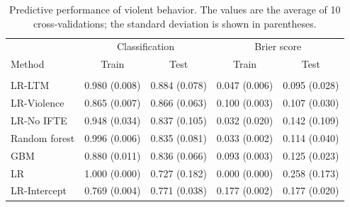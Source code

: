 \documentclass[a4paper,11pt]{article}
\begin{document}
\begin{table}[!ht]
    \caption{Predictive performance of violent behavior. The values are the average of 10 cross-validations; the standard deviation is shown in parentheses.}
    \label{tb:predictions}
    \centering
    \begin{tabular}{lrrrr}
        \toprule
        & \multicolumn{2}{c}{Classification} & \multicolumn{2}{c}{Brier score}\\
        \cmidrule(lr){2-3}  \cmidrule(lr){4-5}
        Method & \multicolumn{1}{c}{Train} & \multicolumn{1}{c}{Test} & \multicolumn{1}{c}{Train} & \multicolumn{1}{c}{Test} \\
        \midrule \\
        LR-LTM & 0.980 (0.008) & 0.884 (0.078) & 0.047 (0.006) & 0.095 (0.028) \\ 
        LR-Violence & 0.865 (0.007) & 0.866 (0.063) & 0.100 (0.003) & 0.107 (0.030) \\ 
        LR-No IFTE & 0.948 (0.034) & 0.837 (0.105) & 0.032 (0.020) & 0.142 (0.109) \\ 
        Random forest & 0.996 (0.006) & 0.835 (0.081) & 0.033 (0.002) & 0.114 (0.040) \\ 
        GBM & 0.880 (0.011) & 0.836 (0.066) & 0.093 (0.003) & 0.125 (0.023) \\ 
        LR & 1.000 (0.000) & 0.727 (0.182) & 0.000 (0.000) & 0.258 (0.173) \\ 
        LR-Intercept & 0.769 (0.004) & 0.771 (0.038) & 0.177 (0.002) & 0.177 (0.020) \\ 
        \bottomrule
    \end{tabular}
\end{table}
\end{document}
